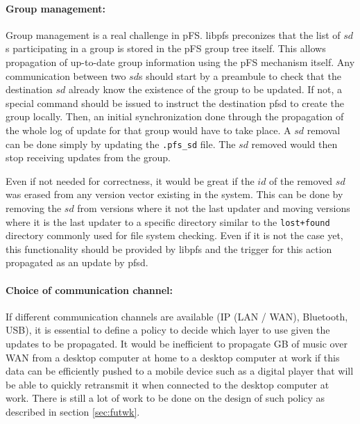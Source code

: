 \paragraph {Group management:}
Group management is a real challenge in pFS. libpfs preconizes that
the list of $sd$s participating in a group is stored in the pFS group
tree itself. This allows propagation of up-to-date group information
using the pFS mechanism itself. Any communication between two $sd$s
should start by a preambule to check that the destination $sd$ already
know the existence of the group to be updated. If not, a special
command should be issued to instruct the destination pfsd to create the group
locally. Then, an initial synchronization done through the propagation
of the whole log of update for that group would  have to take place. A $sd$
removal can be done simply by updating the {\tt .pfs\_sd} file. The $sd$
removed would then stop receiving updates from the group.

Even if not needed for correctness, it would be great if the $id$ of
the removed $sd$ was erased from any version vector existing in the
system. This can be done by removing the $sd$ from versions where it
not the last updater and moving versions where it is the last updater
to a specific directory similar to the {\tt lost+found} directory
commonly used for file system checking. Even if it is not the case
yet, this functionality should be provided by libpfs and the trigger
for this action propagated as an update by pfsd.

\paragraph {Choice of communication channel:}
If different communication channels are available (IP (LAN / WAN),
Bluetooth, USB), it is essential to define a policy to decide which
layer to use given the updates to be propagated. It would be
inefficient to propagate GB of music over WAN from a desktop computer
at home to a desktop computer at work if this data can be efficiently
pushed to a mobile device such as a digital player that will be able
to quickly retransmit it when connected to the desktop computer at
work. There is still a lot of work to be done on the design of such
policy as described in section \ref{sec:futwk}.


